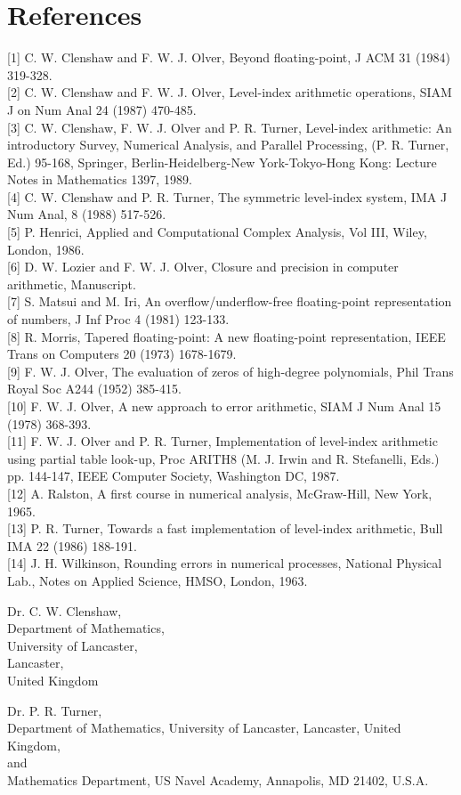 \documentclass[10pt]{article}
\begin{document}
\section*{References}
[1] C. W. Clenshaw and F. W. J. Olver, Beyond floating-point, J ACM 31 (1984) 319-328.\\[0pt]
[2] C. W. Clenshaw and F. W. J. Olver, Level-index arithmetic operations, SIAM J on Num Anal 24 (1987) 470-485.\\[0pt]
[3] C. W. Clenshaw, F. W. J. Olver and P. R. Turner, Level-index arithmetic: An introductory Survey, Numerical Analysis, and Parallel Processing, (P. R. Turner, Ed.) 95-168, Springer, Berlin-Heidelberg-New York-Tokyo-Hong Kong: Lecture Notes in Mathematics 1397, 1989.\\[0pt]
[4] C. W. Clenshaw and P. R. Turner, The symmetric level-index system, IMA J Num Anal, 8 (1988) 517-526.\\[0pt]
[5] P. Henrici, Applied and Computational Complex Analysis, Vol III, Wiley, London, 1986.\\[0pt]
[6] D. W. Lozier and F. W. J. Olver, Closure and precision in computer arithmetic, Manuscript.\\[0pt]
[7] S. Matsui and M. Iri, An overflow/underflow-free floating-point representation of numbers, J Inf Proc 4 (1981) 123-133.\\[0pt]
[8] R. Morris, Tapered floating-point: A new floating-point representation, IEEE Trans on Computers 20 (1973) 1678-1679.\\[0pt]
[9] F. W. J. Olver, The evaluation of zeros of high-degree polynomials, Phil Trans Royal Soc A244 (1952) 385-415.\\[0pt]
[10] F. W. J. Olver, A new approach to error arithmetic, SIAM J Num Anal 15 (1978) 368-393.\\[0pt]
[11] F. W. J. Olver and P. R. Turner, Implementation of level-index arithmetic using partial table look-up, Proc ARITH8 (M. J. Irwin and R. Stefanelli, Eds.) pp. 144-147, IEEE Computer Society, Washington DC, 1987.\\[0pt]
[12] A. Ralston, A first course in numerical analysis, McGraw-Hill, New York, 1965.\\[0pt]
[13] P. R. Turner, Towards a fast implementation of level-index arithmetic, Bull IMA 22 (1986) 188-191.\\[0pt]
[14] J. H. Wilkinson, Rounding errors in numerical processes, National Physical Lab., Notes on Applied Science, HMSO, London, 1963.

Dr. C. W. Clenshaw,\\
Department of Mathematics,\\
University of Lancaster,\\
Lancaster,\\
United Kingdom

Dr. P. R. Turner,\\
Department of Mathematics, University of Lancaster, Lancaster, United Kingdom,\\
and\\
Mathematics Department, US Navel Academy, Annapolis, MD 21402, U.S.A.
\end{document}
